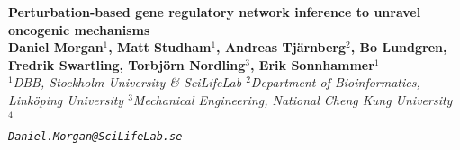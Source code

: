 \documentclass[a0,portrait]{a0poster}
\begin{document}


\begin{minipage}[b]{\linewidth}
\veryHuge \color{NavyBlue} \textbf{Perturbation-based gene regulatory network inference to unravel oncogenic mechanisms} \color{Black}\\ %
\huge \textbf{ Daniel Morgan$^1$, Matt Studham$^1$, Andreas Tj\"{a}rnberg$^2$, Bo Lundgren, Fredrik Swartling, Torbj\"{o}rn  Nordling$^3$, Erik Sonnhammer$^1$ } \\[0.1cm]
\large $^1$\it {DBB, Stockholm University \& SciLifeLab} $^2$\it{Department of Bioinformatics, Link\"{o}ping University} $^3$\it {Mechanical Engineering, National Cheng Kung University} $^4$\it \\[0.4cm]
\Large \texttt{Daniel.Morgan@SciLifeLab.se}
\end{minipage}
%

\vspace{1cm} %

\end{document}
